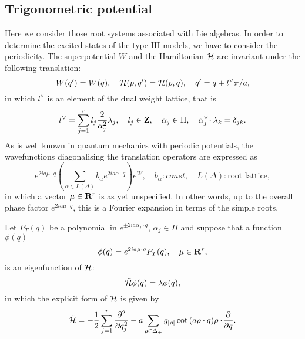 \documentclass[a4paper,12pt]{article}
\begin{document}
\subsection{Trigonometric potential}
\label{triginvcase}
Here we consider those root systems associated with Lie algebras.
In order to determine the excited states of the type III models,
 we have to consider the periodicity.
The superpotential \(W\) and the Hamiltonian \({\cal H}\) are invariant
under
the following translation:
\begin{equation}
   W(q^\prime)=W(q),\quad
   {\cal H}(p, q^\prime)={\cal H}(p, q),\quad
   q^\prime=q+l^\vee\pi/a,
\end{equation}
in which \(l^\vee\) is an element of the dual weight lattice, that is
\begin{equation}
   l^\vee=\sum_{j=1}^r l_j{2\over{\alpha_j^2}}\lambda_j,\quad l_j\in
   {\bf Z},\quad \alpha_j\in\Pi,\quad
   \alpha_j^\vee\!\cdot\lambda_k=\delta_{jk}.
\end{equation}
As is well known in quantum mechanics with periodic potentials,
the wavefunctions diagonalising the translation operators
are expressed as
\begin{equation}
   e^{2ia\mu\cdot q}\left(\sum_{\alpha\in
   L(\Delta)}b_{\alpha}e^{2ia\alpha\cdot q}\right)e^W,\quad b_\alpha :
   const,
   \quad L(\Delta): \mbox{root lattice},
\end{equation}
in which a vector \(\mu\in{\bf R}^r\) is as yet unspecified. In
other words, up to the overall phase factor \(e^{2ia\mu\cdot q}\), this
is a Fourier expansion in terms of the simple roots.

Let \(P_T(q)\) be a polynomial in \(e^{\pm2ia\alpha_j\cdot q}\),
\(\alpha_j\in \Pi\) and   suppose that a function  \(\phi(q)\)
\begin{equation}
   \phi(q)=e^{2ia\mu\cdot q}P_T(q),\quad \mu\in{\bf R}^r,
   \label{trigeigen}
\end{equation}
is an eigenfunction
of \(\tilde{\cal H}\):
\begin{equation}
   \tilde{\cal H}\phi(q)=\lambda \phi(q),
   \end{equation}
   in which the explicit form of \(\tilde{\cal H}\) is given by
   \begin{equation}
   \tilde{\cal H}=
   -{1\over2}\sum_{j=1}^r{\partial^2\over{\partial q_j^2}}
   -a\sum_{\rho\in\Delta_+}{g_{|\rho|}\cot{(a\rho\cdot q)}}
   \rho\cdot\!{\partial\over{\partial q}}.
   \label{Htilcot}
\end{equation}
\end{document}
